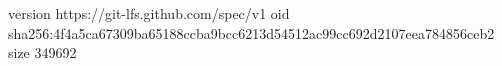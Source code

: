 version https://git-lfs.github.com/spec/v1
oid sha256:4f4a5ca67309ba65188ccba9bcc6213d54512ac99cc692d2107eea784856ceb2
size 349692
